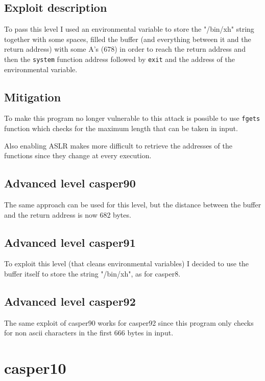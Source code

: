 \documentclass[a4paper,12pt]{article}
\begin{document}
\subsection{Exploit description}

To pass this level I used an environmental variable to store the "/bin/xh" string together with some spaces, filled the buffer (and everything between it and the return address) with some A's (678) in order to reach the return address and then the \texttt{system} function address followed by \texttt{exit} and the address of the environmental variable.

\subsection{Mitigation}
To make this program no longer vulnerable to this attack is possible to use \texttt{fgets} function which checks for the maximum length that can be taken in input.

Also enabling ASLR makes more difficult to retrieve the addresses of the functions since they change at every execution.


\subsection{Advanced level casper90}
The same approach can be used for this level, but the distance between the buffer and the return address is now 682 bytes.

\subsection{Advanced level casper91}

To exploit this level (that cleans environmental variables) I decided to use the buffer itself to store the string "/bin/xh", as for casper8.

\subsection{Advanced level casper92}
The same exploit of casper90 works for casper92 since this program only checks for non ascii characters in the first 666 bytes in input.





\section{casper10}
\end{document}
